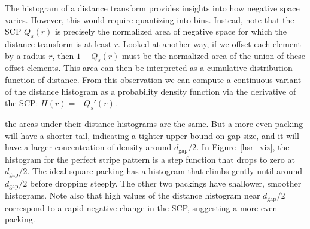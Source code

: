 The histogram of a distance transform provides insights into how negative space varies. 
However, this would require quantizing  into bins.
Instead, note that the SCP $Q_s(r)$ is precisely the normalized area of 
negative space for which the distance transform is at least $r$. 
Looked at another way, if we offset each element by a
radius $r$, then $1-Q_s(r)$ must be the normalized 
area of the union of these offset elements.
This area can then be interpreted as 
a cumulative distribution function of distance.  From this observation
we can compute a continuous variant of the distance histogram as a 
probability density function via the derivative of the SCP: $H(r)=-Q_s'(r)$.


the areas under their distance histograms
are the same.  But a more even packing will have a shorter tail,
indicating a tighter upper bound on gap size, and it will have a larger
concentration of density around $d_\mathrm{gap}/2$.  In Figure~\ref{hsr_viz},
the histogram for the perfect stripe pattern is a step function that drops
to zero at $d_\mathrm{gap}/2$.  The ideal square packing has a histogram
that climbs gently until around $d_\mathrm{gap}/2$ before dropping
steeply.  The other two packings have shallower, smoother histograms.
Note also that high values of the distance histogram near $d_\mathrm{gap}/2$
correspond to a rapid negative change in the SCP, suggesting a more even
packing.


